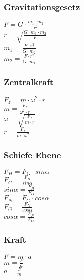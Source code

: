 \subsubsection{Gravitationsgesetz} 
\begin{minipage}{0.45\textwidth} 
$ F = G \cdot  \frac{m_{1} \cdot m_{2} }{  r^{2} } $\\ 
$ r = \sqrt{\frac{G\cdot m_{1} \cdot m_{2} }{   F}} $\\ 
$ m_{1}  =  \frac{F\cdot r^{2} }{G\cdot m_{2} } $\\ 
$ m_{2}  =  \frac{F\cdot r^{2} }{G\cdot m_{1} } $\\ 
\end{minipage} 
\begin{minipage}{0.45\textwidth} 
 
\end{minipage} 
\subsubsection{Zentralkraft} 
\begin{minipage}{0.45\textwidth} 
$ F_{z}  = m\cdot \omega ^{2} \cdot r $\\ 
$ m = \frac{ F_{z} }{\omega ^{2} \cdot r} $\\ 
$ \omega  = \sqrt{\frac{ F_{z} }{m\cdot r}} $\\ 
$ r = \frac{ F_{z} }{m\cdot \omega ^{2} } $\\ 
\end{minipage} 
\begin{minipage}{0.45\textwidth} 
 
\end{minipage} 
\subsubsection{Schiefe Ebene} 
\begin{minipage}{0.45\textwidth} 
$ F_{H}  = F_{G} \cdot sin \alpha $\\ 
$ F_{G}  = \frac{ F_{H} }{sin \alpha } $\\ 
$ sin \alpha  = \frac{F_{H} }{F_{G} } $\\ 
$ F_{N}  = F_{G} \cdot cos \alpha $\\ 
$ F_{G}  = \frac{ F_{N} }{cos \alpha } $\\ 
$ cos \alpha  = \frac{F_{N} }{F_{G} } $\\ 
\end{minipage} 
\begin{minipage}{0.45\textwidth} 
 
\end{minipage} 
\subsubsection{Kraft} 
\begin{minipage}{0.45\textwidth} 
$ F = m\cdot a $\\ 
$ m = \frac{F}{a} $\\ 
$ a = \frac{F}{m} $\\ 
\end{minipage} 
\begin{minipage}{0.45\textwidth} 
 
\end{minipage} 
